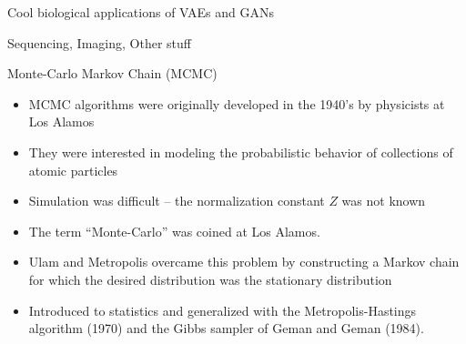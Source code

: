 \documentclass{beamer}					%
\begin{document}
\begin{frame}{Cool biological applications of VAEs and GANs}

Sequencing, Imaging, Other stuff

\end{frame}


\begin{frame}{Monte-Carlo Markov Chain (MCMC)}

\begin{itemize}

\item MCMC algorithms were originally developed in the 1940’s by physicists at
Los Alamos

\item They were interested in modeling the probabilistic behavior of collections of
atomic particles

\item Simulation was difficult – the normalization constant $Z$ was not known

\item The term “Monte-Carlo” was coined at Los Alamos.

\item Ulam and Metropolis overcame this problem by constructing a Markov chain
for which the desired distribution was the stationary distribution

\item Introduced to statistics and generalized with the Metropolis-Hastings
algorithm (1970) and the Gibbs sampler of Geman and Geman (1984).
\end{itemize}

\end{frame}
\end{document}
